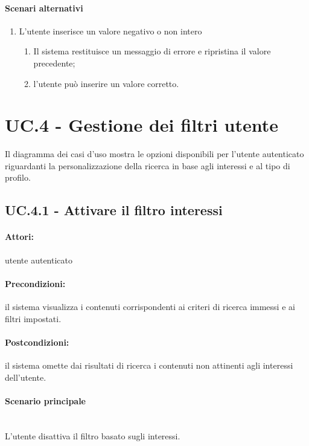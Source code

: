 \documentclass[10pt,a4paper,headinclude,footinclude,hidelinks]{scrreprt} %
\begin{document}
	\paragraph{Scenari alternativi}
	\begin{enumerate}
	\item L'utente inserisce un valore negativo o non intero
		\begin{enumerate}
		\item Il sistema restituisce un messaggio di errore e ripristina il valore precedente;
		\item l'utente può inserire un valore corretto.
		\end{enumerate}
	\end{enumerate}

	\section{UC.4 - Gestione dei filtri utente}
	\label{ch:stage:ar:uc:4}
	Il diagramma dei casi d'uso mostra le opzioni disponibili per l'utente autenticato riguardanti la personalizzazione della ricerca in base agli interessi e al tipo di profilo.

	\subsection[UC.4.1]{UC.4.1 - Attivare il filtro interessi}
	\label{sec:stage:ar:uc:4_1}
	\paragraph{Attori:} utente autenticato
	\paragraph{Precondizioni:} il sistema visualizza i contenuti corrispondenti ai criteri di ricerca immessi e ai filtri impostati.
	\paragraph{Postcondizioni:} il sistema omette dai risultati di ricerca i contenuti non attinenti agli interessi dell'utente.
	\paragraph{Scenario principale} \hfill \\
	L'utente disattiva il filtro basato sugli interessi.
\end{document}
